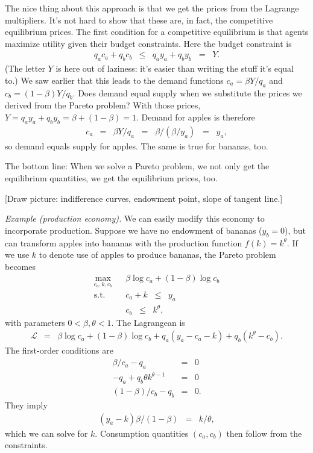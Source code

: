 \documentclass[11pt]{article}
\begin{document}
The nice thing about this approach is that
we get the prices from the Lagrange multipliers.
It's not hard to show that these are, in fact,
the competitive equilibrium prices.
The first condition for a competitive equilibrium is that agents maximize
utility given their budget constraints.
Here the budget constraint is
\begin{eqnarray*}
    q_a c_a + q_b c_b &\leq& q_a y_a + q_b y_b \;\;=\;\; Y.
\end{eqnarray*}
(The letter $Y$ is here out of laziness:  it's easier than writing
the stuff it's equal to.)
We saw earlier that this leads to the demand functions
$ c_a = \beta Y/q_a$ and $c_b = (1-\beta) Y/q_b$.
Does demand equal supply when we substitute the prices we derived
from the Pareto problem?
With those prices,
$ Y = q_a y_a + q_b y_b = \beta + (1-\beta) = 1$.
Demand for apples is therefore
\begin{eqnarray*}
    c_a &=& \beta Y / q_a \;\;=\;\; \beta / (\beta/y_a) \;\;=\;\; y_ a,
\end{eqnarray*}
so demand equals supply for apples.
The same is true for bananas, too.

The bottom line:  When we solve a Pareto problem,
we not only get the equilibrium quantities,
we get the equilibrium prices, too.


[Draw picture:  indifference curves, endowment point,
slope of tangent line.]

{\it Example (production economy).\/}
We can easily modify this economy to incorporate production.
Suppose we have no endowment of bananas ($y_b=0$),
but can transform apples into bananas with the
production function $f(k) = k^\theta$.
If we use $k$ to denote use of apples to produce bananas,
the Pareto problem becomes
\begin{eqnarray*}
    \max_{c_a,k,c_b} &&  \beta \log c_a + (1-\beta) \log c_b \\
    \mbox{s.t.}   &&  c_a + k \;\;\leq\;\; y_a \\
                  &&  c_b \;\;\leq\;\; k^\theta ,
\end{eqnarray*}
with parameters $ 0 < \beta,\theta < 1$.
The Lagrangean is
\begin{eqnarray*}
    \mathcal{L} &=&  \beta \log c_a + (1-\beta) \log c_b
                + q_a (y_a - c_a - k) + q_b (k^\theta - c_b ) .
\end{eqnarray*}
The first-order conditions are
\begin{eqnarray*}
    \beta/c_a - q_a &=& 0 \\
    - q_a + q_b \theta k^{\theta-1} &=& 0 \\
   (1-\beta)/c_b - q_b &=& 0 .
\end{eqnarray*}
They imply
\begin{eqnarray*}
    (y_a - k) \beta /(1-\beta) &=& k / \theta ,
\end{eqnarray*}
which we can solve for $k$.
Consumption quantities $(c_a,c_b)$ then follow from the
constraints.
\end{document}
